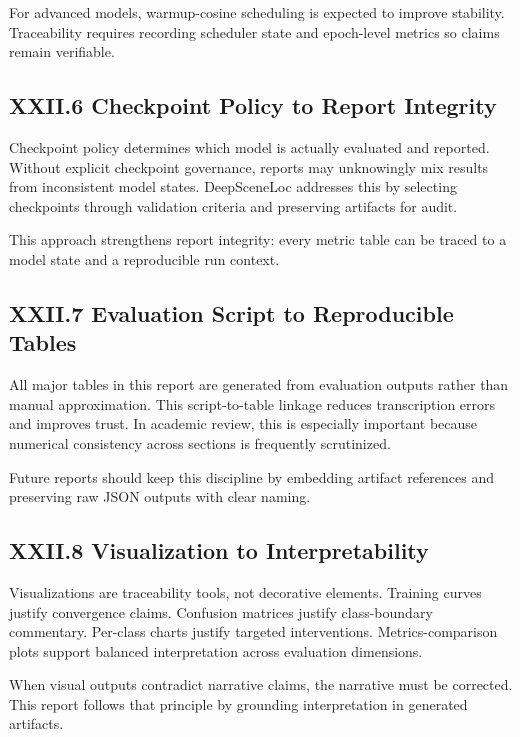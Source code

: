 For advanced models, warmup-cosine scheduling is expected to improve stability. Traceability requires recording scheduler state and epoch-level metrics so claims remain verifiable.

\subsection*{XXII.6 Checkpoint Policy to Report Integrity}
Checkpoint policy determines which model is actually evaluated and reported. Without explicit checkpoint governance, reports may unknowingly mix results from inconsistent model states. DeepSceneLoc addresses this by selecting checkpoints through validation criteria and preserving artifacts for audit.

This approach strengthens report integrity: every metric table can be traced to a model state and a reproducible run context.

\subsection*{XXII.7 Evaluation Script to Reproducible Tables}
All major tables in this report are generated from evaluation outputs rather than manual approximation. This script-to-table linkage reduces transcription errors and improves trust. In academic review, this is especially important because numerical consistency across sections is frequently scrutinized.

Future reports should keep this discipline by embedding artifact references and preserving raw JSON outputs with clear naming.

\subsection*{XXII.8 Visualization to Interpretability}
Visualizations are traceability tools, not decorative elements. Training curves justify convergence claims. Confusion matrices justify class-boundary commentary. Per-class charts justify targeted interventions. Metrics-comparison plots support balanced interpretation across evaluation dimensions.

When visual outputs contradict narrative claims, the narrative must be corrected. This report follows that principle by grounding interpretation in generated artifacts.

